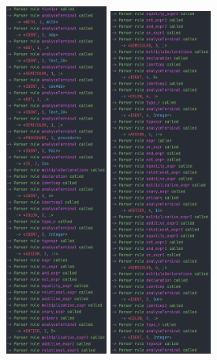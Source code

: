 \documentclass[french,a4paper]{article}
\begin{document}
    \begin{figure}[H]
        \centering
        \includegraphics[width=0.3\textwidth]{sortie1}
        \hfill
        \includegraphics[width=0.3\textwidth]{sortie2}

\end{figure}
\end{document}
